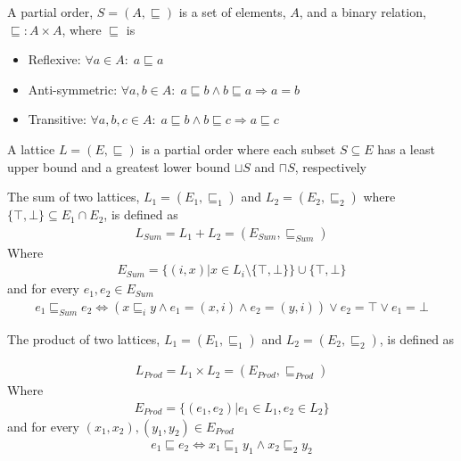 \begin{definition}
A partial order, $S = (A, \sqsubseteq)$ is a set of elements, $A$, and a binary relation, $\sqsubseteq : A \times A$, where $\sqsubseteq$ is 

\begin{itemize}
\item Reflexive: $\forall a \in A:\; a \sqsubseteq a$
\item Anti-symmetric: $\forall a,b \in A:\; a \sqsubseteq b \wedge b \sqsubseteq a \Rightarrow a = b$
\item Transitive: $\forall a,b,c \in A:\; a \sqsubseteq b \wedge b \sqsubseteq c \Rightarrow a \sqsubseteq c$
\end{itemize}


\end{definition}

\begin{definition}
A lattice $L = (E, \sqsubseteq)$ is a partial order where each subset $S \subseteq E$ has a least upper bound and a greatest lower bound $\sqcup S$ and $\sqcap S$, respectively
\end{definition}


\begin{definition}
The sum of two lattices, $L_1 = (E_1, \sqsubseteq_1)$ and $L_2 = (E_2, \sqsubseteq_2)$ where $\{\top, \bot\}\subseteq E_1 \cap E_2$, is defined as
\begin{align}
L_{Sum} = L_1 + L_2 = (E_{Sum}, \sqsubseteq_{Sum})
\end{align}
Where 
\begin{align}
E_{Sum} = \{(i,x) | x \in L_i\setminus\{\top, \bot\}\} \cup \{\top, \bot\}
\end{align}
and for every $e_1, e_2\in E_{Sum}$  
\begin{align}
e_1 \sqsubseteq_{Sum} e_2 \Leftrightarrow (x \sqsubseteq_i y \wedge e_1 = (x,i) \wedge e_2 = (y,i)) \vee e_2 = \top \vee e_1 = \bot
\end{align}
\end{definition}

\begin{definition}
The product of two lattices,  $L_1 = (E_1, \sqsubseteq_1)$ and $L_2 = (E_2, \sqsubseteq_2)$, is defined as 

\begin{align}
L_{Prod} = L_1 \times L_2 = (E_{Prod}, \sqsubseteq_{Prod})
\end{align}
Where 
\begin{align}
E_{Prod} = \{(e_1, e_2) |  e_1 \in L_1, e_2 \in L_2\}
\end{align}
and for every $(x_1, x_2), (y_1, y_2)\in E_{Prod}$ 
\begin{align}
e_1 \sqsubseteq e_2 \Leftrightarrow x_1 \sqsubseteq_1 y_1 \wedge x_2 \sqsubseteq_2 y_2
\end{align}
\end{definition}


